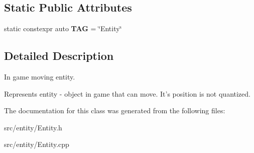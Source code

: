 \subsection*{Static Public Attributes}
\begin{DoxyCompactItemize}
\item 
\hypertarget{classEntity_a71274935a057ccb8119a625d1bff7ac4}{static constexpr auto {\bfseries T\-A\-G} = \char`\"{}Entity\char`\"{}}\label{classEntity_a71274935a057ccb8119a625d1bff7ac4}

\end{DoxyCompactItemize}


\subsection{Detailed Description}
In game moving entity. 

Represents entity -\/ object in game that can move. It's position is not quantized. 

The documentation for this class was generated from the following files\-:\begin{DoxyCompactItemize}
\item 
src/entity/Entity.\-h\item 
src/entity/Entity.\-cpp\end{DoxyCompactItemize}
